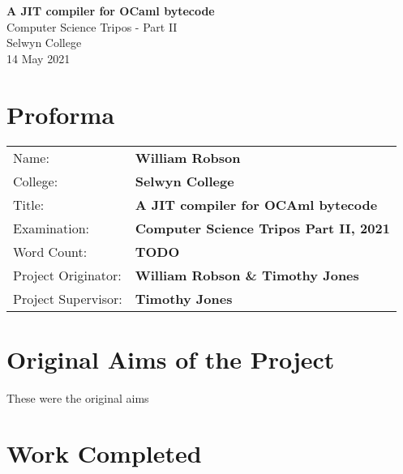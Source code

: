 
\newcommand{\thedate}{14 May 2021}

\begin{titlepage}


    \vspace*{60mm}

    \begin{center}
        \Huge
        \textbf{A JIT compiler for OCaml bytecode} \\[5mm]
        \Large
        Computer Science Tripos - Part II \\[5mm]
        Selwyn College \\[5mm]
        \thedate
    \end{center}

    \cleardoublepage

\end{titlepage}


\section*{Proforma}

{\large

\begin{tabular}{ll}
    Name: & \textbf{William Robson} \\
    College: & \textbf{Selwyn College} \\
    Title: & \textbf{A JIT compiler for OCAml bytecode} \\
    Examination: & \textbf{Computer Science Tripos Part II, 2021} \\
    Word Count: & \textbf{TODO} \\
    Project Originator: & \textbf{William Robson \& Timothy Jones} \\
    Project Supervisor: & \textbf{Timothy Jones} \\
\end{tabular}
}

\section*{Original Aims of the Project}

These were the original aims

\section*{Work Completed}

